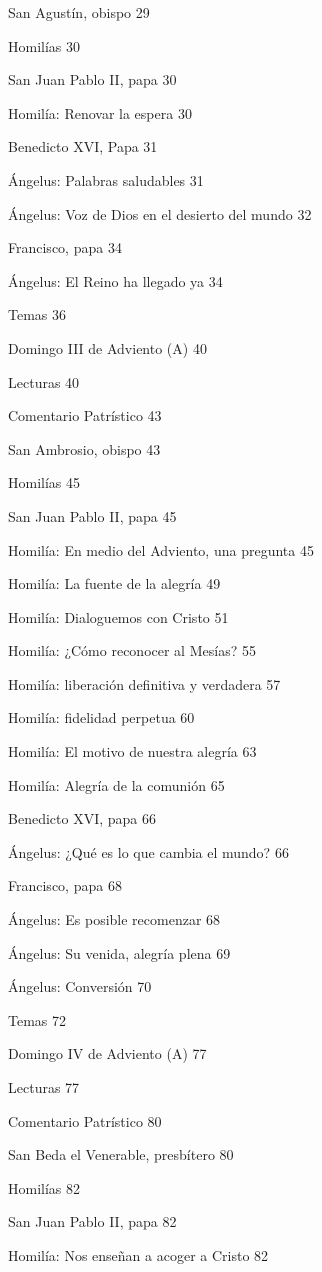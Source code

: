 \documentclass[]{article}
\begin{document}
San Agustín, obispo 29

Homilías 30

San Juan Pablo II, papa 30

Homilía: Renovar la espera 30

Benedicto XVI, Papa 31

Ángelus: Palabras saludables 31

Ángelus: Voz de Dios en el desierto del mundo 32

Francisco, papa 34

Ángelus: El Reino ha llegado ya 34

Temas 36

Domingo III de Adviento (A) 40

Lecturas 40

Comentario Patrístico 43

San Ambrosio, obispo 43

Homilías 45

San Juan Pablo II, papa 45

Homilía: En medio del Adviento, una pregunta 45

Homilía: La fuente de la alegría 49

Homilía: Dialoguemos con Cristo 51

Homilía: ¿Cómo reconocer al Mesías? 55

Homilía: liberación definitiva y verdadera 57

Homilía: fidelidad perpetua 60

Homilía: El motivo de nuestra alegría 63

Homilía: Alegría de la comunión 65

Benedicto XVI, papa 66

Ángelus: ¿Qué es lo que cambia el mundo? 66

Francisco, papa 68

Ángelus: Es posible recomenzar 68

Ángelus: Su venida, alegría plena 69

Ángelus: Conversión 70

Temas 72

Domingo IV de Adviento (A) 77

Lecturas 77

Comentario Patrístico 80

San Beda el Venerable, presbítero 80

Homilías 82

San Juan Pablo II, papa 82

Homilía: Nos enseñan a acoger a Cristo 82
\end{document}
